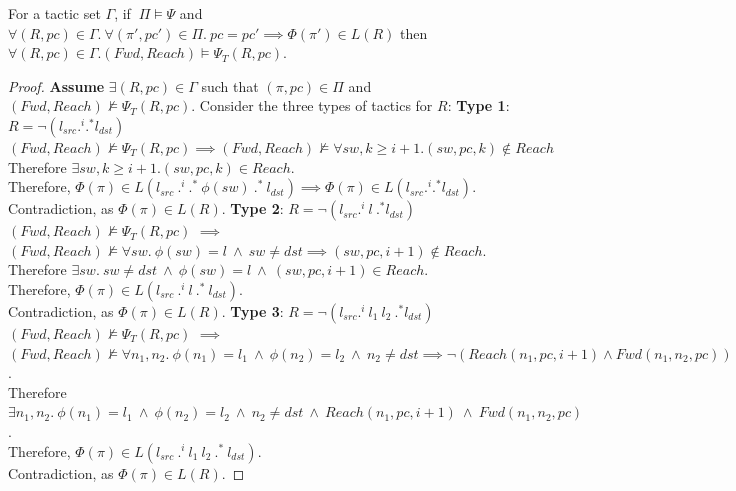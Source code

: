 \begin{theorem}[Completeness]
For a tactic set $\Gamma$, if $~\Pi \models \Psi$ and 
$\forall (R, pc) \in \Gamma. ~\forall(\pi', pc') \in \Pi. ~pc = pc' \implies \Phi(\pi') \in L(R)$
then $\forall (R, pc) \in \Gamma. (Fwd, Reach) \models \Psi_T(R, pc)$.
\end{theorem}
\iffull
\begin{proof}
	\textbf{Assume} $\exists (R, pc) \in \Gamma$ such that $(\pi, pc) \in \Pi$ and  
	$(Fwd, Reach) \not\models \Psi_T(R,pc)$.
	Consider the three types of tactics for $R$: \newline
	\textbf{Type 1}: $R = \neg (l_{src} .^i .^* l_{dst})$ \newline
	$(Fwd, Reach) \not\models \Psi_T(R, pc) \implies (Fwd, Reach) \not\models \forall sw,k \geq i + 1. (sw,pc,k) \notin Reach$ \newline
	Therefore $\exists sw, k \geq i + 1. (sw,pc,k) \in Reach$. \\
	Therefore, $\Phi(\pi) \in L(l_{src}\ .^i \ .^* \ \phi(sw) \ .^* \ l_{dst}) \implies \Phi(\pi) \in L(l_{src} .^i .^* l_{dst}).$\\
	Contradiction, as $\Phi(\pi) \in L(R)$.
	\newline 
	\newline 
	\textbf{Type 2}: $R = \neg (l_{src} .^i \ l \ .^* l_{dst})$ \newline
	$(Fwd, Reach) \not\models \Psi_T(R, pc)$ $\implies$ $(Fwd, Reach) \not\models \forall sw.~ \phi(sw) = l ~\wedge~ sw \not= dst \implies  (sw, pc, i + 1) \notin Reach$. \\
	Therefore $\exists sw. \ sw \not= dst \ \wedge \ \phi(sw) = l \ \wedge \ (sw,pc,i+1) \in Reach$. \\
	Therefore, $\Phi(\pi) \in L( l_{src}\ .^i \ l \ .^* \ l_{dst})$. \\
	Contradiction, as $\Phi(\pi) \in L(R)$. 
	\newline  
	\newline
	\textbf{Type 3}: $R = \neg (l_{src} .^i \ l_1 \ l_2 \ .^* l_{dst})$ \newline
	$(Fwd, Reach) \not\models \Psi_T(R, pc)$ $\implies$ $(Fwd, Reach) \not\models \forall n_1, n_2.~\phi(n_1) = l_1~\wedge~ \phi(n_2) = l_2 ~\wedge~ n_2 \not=dst  \implies 
	\neg (Reach(n_1, pc, i + 1) \wedge Fwd(n_1, n_2, pc))$. \\
	Therefore $\exists n_1, n_2. ~\phi(n_1) = l_1~\wedge~ \phi(n_2) = l_2 ~\wedge~ n_2 \not=dst ~\wedge~ Reach(n_1, pc, i + 1) ~\wedge~ Fwd(n_1, n_2, pc)$. \\
	Therefore, $\Phi(\pi) \in L(l_{src}\ .^i \ l_1~l_2 \ .^* \ l_{dst})$. \\
	Contradiction, as $\Phi(\pi) \in L(R)$.
\end{proof}
\fi

